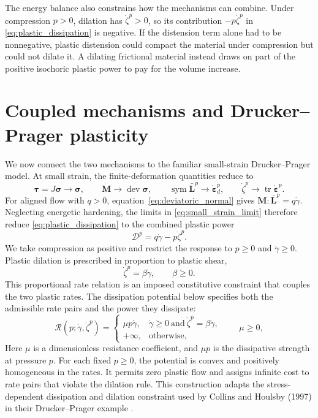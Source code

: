 \documentclass[11pt]{article}
\newcommand{\mbf}[1]{\mathbf{#1}}
\newcommand{\bs}[1]{\boldsymbol{#1}}
\newcommand{\dev}{\operatorname{dev}}
\newcommand{\tr}{\operatorname{tr}}
\begin{document}
The energy balance also constrains how the mechanisms can combine. Under
compression \(p>0\), dilation has \(\dot\zeta^p>0\), so its contribution
\(-p\dot\zeta^p\) in \eqref{eq:plastic_dissipation} is negative.  If the
distension term alone had to be nonnegative, plastic distension could compact
the material under compression but could not dilate it.  A dilating frictional
material instead draws on part of the positive isochoric plastic power to pay
for the volume increase.

\section{Coupled mechanisms and Drucker--Prager plasticity}
\label{sec:drucker_prager}

We now connect the two mechanisms to the familiar small-strain
Drucker--Prager model. At small strain, the finite-deformation quantities
reduce to
\begin{equation}
	\bs\tau=J\bs\sigma\longrightarrow\bs\sigma,
	\qquad
	\mbf M\longrightarrow\dev\bs\sigma,
	\qquad
	\operatorname{sym}\bar{\mbf L}^{p}
	\longrightarrow\dot{\bs\varepsilon}^{p}_{d},
	\qquad
	\dot\zeta^p\longrightarrow\tr\dot{\bs\varepsilon}^{p}.
	\label{eq:small_strain_limit}
\end{equation}
For aligned flow with \(q>0\), equation~\eqref{eq:deviatoric_normal} gives
\(\mbf M:\bar{\mbf L}^p=q\dot\gamma\).  Neglecting energetic hardening, the
limits in \eqref{eq:small_strain_limit} therefore reduce
\eqref{eq:plastic_dissipation} to the combined plastic power
\begin{equation}
	\mathcal D^p=q\dot\gamma-p\dot\zeta^p.
	\label{eq:small_strain_power}
\end{equation}
We take compression as positive and restrict the response to \(p\ge0\) and
\(\dot\gamma\ge0\). Plastic dilation is prescribed in proportion to plastic
shear,
\begin{equation*}
	\dot\zeta^p=\beta\dot\gamma,
	\qquad
	\beta\ge0.
\end{equation*}
This proportional rate relation is an imposed constitutive constraint that
couples the two plastic rates. The dissipation potential below specifies both
the admissible rate pairs and the power they dissipate:
\begin{equation}
	\mathcal R(p;\dot\gamma,\dot\zeta^p)
	=
	\begin{cases}
		\mu p\dot\gamma,
		         & \dot\gamma\ge0\ \text{and}\
		\dot\zeta^p=\beta\dot\gamma,           \\
		+\infty, & \text{otherwise},
	\end{cases}
	\qquad \mu\ge0,
	\label{eq:dissipation_potential}
\end{equation}
Here \(\mu\) is a dimensionless resistance coefficient, and \(\mu p\) is the
dissipative strength at pressure \(p\). For each fixed \(p\ge0\), the potential
is convex and positively homogeneous in the rates. It permits zero plastic flow
and assigns infinite cost to rate pairs that violate the dilation rule.
This construction adapts the
stress-dependent dissipation and dilation constraint used by Collins and
Houlsby (1997) in their Drucker--Prager example
\cite[eqs.~(5.8)--(5.14)]{collins1997}.
\end{document}
